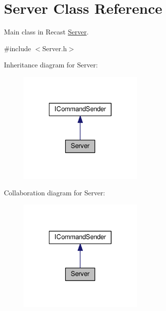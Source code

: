 \hypertarget{class_server}{\section{Server Class Reference}
\label{class_server}
}


Main class in Recast \hyperlink{class_server}{Server}.  




{\ttfamily \#include $<$Server.\-h$>$}



Inheritance diagram for Server\-:
\nopagebreak
\begin{figure}[H]
\begin{center}
\leavevmode
\includegraphics[width=174pt]{class_server__inherit__graph}
\end{center}
\end{figure}


Collaboration diagram for Server\-:
\nopagebreak
\begin{figure}[H]
\begin{center}
\leavevmode
\includegraphics[width=174pt]{class_server__coll__graph}
\end{center}
\end{figure}
